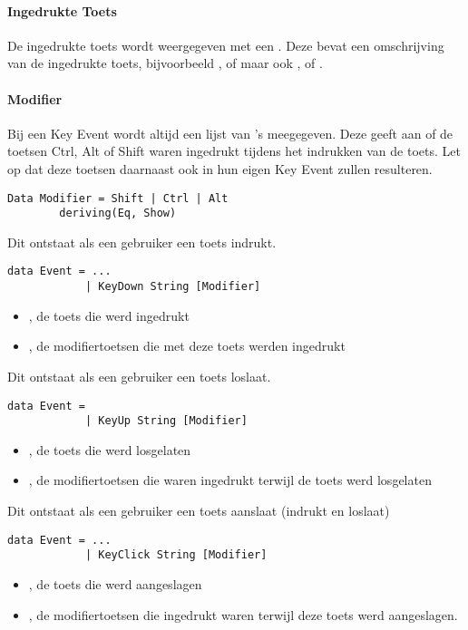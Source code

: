 \paragraph{Ingedrukte Toets}
De ingedrukte toets wordt weergegeven met een . Deze bevat een omschrijving van de ingedrukte toets, bijvoorbeeld ,  of  maar ook ,  of .

\paragraph{Modifier}
Bij een Key Event wordt altijd een lijst van 's meegegeven. Deze geeft aan of de toetsen Ctrl, Alt of Shift waren ingedrukt tijdens het indrukken van de toets. Let op dat deze toetsen daarnaast ook in hun eigen Key Event zullen resulteren.
\begin{lstlisting}
Data Modifier = Shift | Ctrl | Alt
		deriving(Eq, Show)
\end{lstlisting}

Dit  ontstaat als een gebruiker een toets indrukt.
\begin{lstlisting}
data Event = ...
			| KeyDown String [Modifier]
\end{lstlisting}
\begin{itemize}
	\item {}, de toets die werd ingedrukt
	\item \type{[Modifier]}, de modifiertoetsen die met deze toets werden ingedrukt
\end{itemize}

Dit  ontstaat als een gebruiker een toets loslaat.
\begin{lstlisting}
data Event =
			| KeyUp String [Modifier]
\end{lstlisting}
\begin{itemize}
	\item {}, de toets die werd losgelaten
	\item \type{[Modifier]}, de modifiertoetsen die waren ingedrukt terwijl de toets werd losgelaten
\end{itemize}

Dit  ontstaat als een gebruiker een toets aanslaat (indrukt en loslaat)
\begin{lstlisting}
data Event = ...
			| KeyClick String [Modifier]
\end{lstlisting}
\begin{itemize}
	\item {}, de toets die werd aangeslagen
	\item \type{[Modifier]}, de modifiertoetsen die ingedrukt waren terwijl deze toets werd aangeslagen.
\end{itemize}

